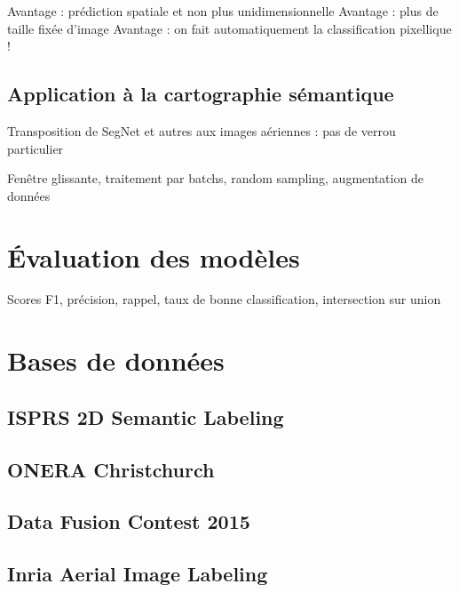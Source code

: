 Avantage : prédiction spatiale et non plus unidimensionnelle
Avantage : plus de taille fixée d'image
Avantage : on fait automatiquement la classification pixellique !

\subsection{Application à la cartographie sémantique}

Transposition de SegNet et autres aux images aériennes : pas de verrou particulier

Fenêtre glissante, traitement par batchs, random sampling, augmentation de données

\section{Évaluation des modèles}

Scores F1, précision, rappel, taux de bonne classification, intersection sur union

\section{Bases de données}

\subsection{ISPRS 2D Semantic Labeling}

\subsection{ONERA Christchurch}

\subsection{Data Fusion Contest 2015}

\subsection{Inria Aerial Image Labeling}
	


